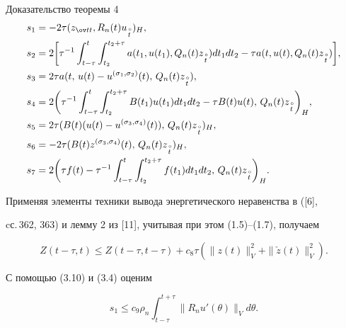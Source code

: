 \begin{pf*}{Доказательство теоремы 4}
\begin{align*}


s_1&=-2\tau(z_{\ov tt},R_n(t)u_{\overset{\,\circ}{t}})_H,\\


s_2&=2\bigg[\tau^{-1}\int_{t-\tau}^t


\int_{t_2}^{t_2+\tau}a(t_1,u(t_1),Q_n(t)z_{\overset{\,\circ}{t}})


dt_1dt_2-\tau a(t,u(t),Q_n(t)z_{\overset{\,\circ}{t}})\bigg],\\


s_3&=2\tau a(t,\,u(t)-u^{(\sigma_1,\sigma_2)}(t),\,Q_n(t)


z_{\overset{\,\circ}{t}}),\\


s_4&=2\bigg(\tau^{-1}\int_{t-\tau}^t\int_{t_2}^{t_2+\tau}B(t_1)u(t_1)


dt_1dt_2-\tau B(t)u(t),\,Q_n(t)z_{\overset{\,\circ}{t}}\bigg)_H,\\


s_5&=2\tau(B(t)(u(t)-u^{(\sigma_3,\sigma_4)}(t)),\,Q_n(t)


z_{\overset{\,\circ}{t}})_H,\\


s_6&=-2\tau(B(t)z^{(\sigma_3,\sigma_4)}(t),\,Q_n(t)


z_{\overset{\,\circ}{t}})_H,\\


s_7&=2\bigg(\tau f(t)-\tau^{-1}\int_{t-\tau}^t\int_{t_2}^{t_2+\tau}


f(t_1)dt_1dt_2,\,Q_n(t)z_{\overset{\,\circ}{t}}\bigg)_H.


\end{align*}


Применяя элементы техники вывода энергетического неравенства в ([6],


cс.\,362, 363) и лемму 2 из [11], учитывая при этом (1.5)--(1.7), получаем


\begin{equation}


Z(t-\tau,t)\le Z(t-\tau,t-\tau)+c_8\tau(\|z(t)\|^2_V+\|


\check z(t)\|_V^2).


\end{equation}


С помощью (3.10) и (3.4) оценим


\begin{equation}


s_1\le c_9\rho_n\int_{t-\tau}^{t+\tau}\|R_nu'(\theta)\|_Vd\theta.



\end{equation}
\end{pf*}
